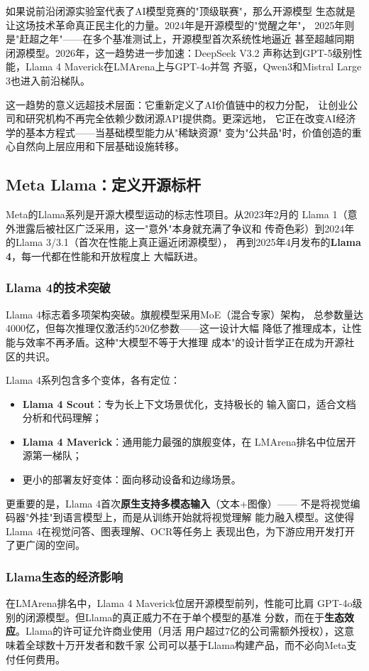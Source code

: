 如果说前沿闭源实验室代表了AI模型竞赛的"顶级联赛"，那么开源模型
生态就是让这场技术革命真正民主化的力量。2024年是开源模型的"觉醒之年"，
2025年则是"赶超之年"——在多个基准测试上，开源模型首次系统性地逼近
甚至超越同期闭源模型。2026年，这一趋势进一步加速：DeepSeek V3.2
声称达到GPT-5级别性能，Llama 4 Maverick在LMArena上与GPT-4o并驾
齐驱，Qwen3和Mistral Large 3也进入前沿梯队。

这一趋势的意义远超技术层面：它重新定义了AI价值链中的权力分配，
让创业公司和研究机构不再完全依赖少数闭源API提供商。更深远地，
它正在改变AI经济学的基本方程式——当基础模型能力从"稀缺资源"
变为"公共品"时，价值创造的重心自然向上层应用和下层基础设施转移。

\subsection{Meta Llama：定义开源标杆}
\label{subsec:llama}

Meta的Llama系列是开源大模型运动的标志性项目。从2023年2月的
Llama 1（意外泄露后被社区广泛采用，这一"意外"本身就充满了争议和
传奇色彩）到2024年的Llama 3/3.1（首次在性能上真正逼近闭源模型），
再到2025年4月发布的\textbf{Llama 4}，每一代都在性能和开放程度上
大幅跃进。

\subsubsection{Llama 4的技术突破}
Llama 4标志着多项架构突破。旗舰模型采用MoE（混合专家）架构，
总参数量达4000亿，但每次推理仅激活约520亿参数——这一设计大幅
降低了推理成本，让性能与效率不再矛盾。这种"大模型不等于大推理
成本"的设计哲学正在成为开源社区的共识。

Llama 4系列包含多个变体，各有定位：
\begin{itemize}
  \item \textbf{Llama 4 Scout}：专为长上下文场景优化，支持极长的
    输入窗口，适合文档分析和代码理解；
  \item \textbf{Llama 4 Maverick}：通用能力最强的旗舰变体，在
    LMArena排名中位居开源第一梯队；
  \item 更小的部署友好变体：面向移动设备和边缘场景。
\end{itemize}

更重要的是，Llama 4首次\textbf{原生支持多模态输入}（文本+图像）——
不是将视觉编码器"外挂"到语言模型上，而是从训练开始就将视觉理解
能力融入模型。这使得Llama 4在视觉问答、图表理解、OCR等任务上
表现出色，为下游应用开发打开了更广阔的空间。

\subsubsection{Llama生态的经济影响}
在LMArena排名中，Llama 4 Maverick位居开源模型前列，性能可比肩
GPT-4o级别的闭源模型。但Llama的真正威力不在于单个模型的基准
分数，而在于\textbf{生态效应}。Llama的许可证允许商业使用（月活
用户超过7亿的公司需额外授权），这意味着全球数十万开发者和数千家
公司可以基于Llama构建产品，而不必向Meta支付任何费用。

